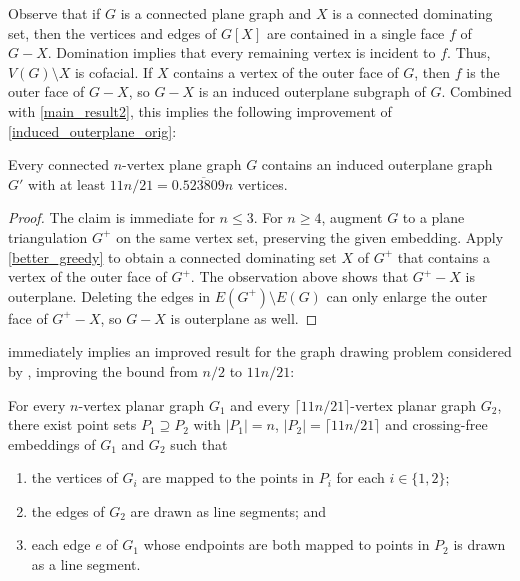 \documentclass{patmorin}
\begin{document}
Observe that if $G$ is a connected plane graph and $X$ is a connected dominating set, then the vertices and edges of $G[X]$ are contained in a single face $f$ of $G-X$. Domination implies that every remaining vertex is incident to $f$. Thus, $V(G)\setminus X$ is cofacial. If $X$ contains a vertex of the outer face of $G$, then $f$ is the outer face of $G-X$, so $G-X$ is an induced outerplane subgraph of $G$.
Combined with \cref{main_result2}, this implies the following improvement of \cref{induced_outerplane_orig}:

\begin{cor}\label{induced_outerplane_improved}
    Every connected $n$-vertex plane graph $G$ contains an induced outerplane graph $G'$ with at least $11n/21=0.\overline{523809}n$ vertices.
\end{cor}

\begin{proof}
The claim is immediate for $n\le3$. For $n\ge 4$, augment $G$ to a plane triangulation $G^+$ on the same vertex set, preserving the given embedding. Apply \cref{better_greedy} to obtain a connected dominating set $X$ of $G^+$ that contains a vertex of the outer face of $G^+$.  The observation above shows that $G^+-X$ is outerplane. Deleting the edges in $E(G^+)\setminus E(G)$ can only enlarge the outer face of $G^+-X$, so $G-X$ is outerplane as well.
\end{proof}

 immediately implies an improved result for the graph drawing problem considered by \cite{angelini.evans.ea:sefe}, improving the bound from $n/2$ to $11n/21$:

\begin{thm}\label{sefenomap}
  For every $n$-vertex planar graph $G_1$ and every $\lceil 11n/21\rceil$-vertex planar graph $G_2$, there exist point sets $P_1\supseteq P_2$ with $|P_1|=n$, $|P_2|=\lceil 11n/21\rceil$ and crossing-free embeddings of $G_1$ and $G_2$ such that
  \begin{enumerate}[nosep,nolistsep,label=\rm(\alph*)]
    \item the vertices of $G_i$ are mapped to the points in $P_i$ for each $i\in\{1,2\}$;
    \item the edges of $G_2$ are drawn as line segments; and
    \item each edge $e$ of $G_1$ whose endpoints are both mapped to points in $P_2$ is drawn as a line segment.
  \end{enumerate}
\end{thm}
\end{document}
